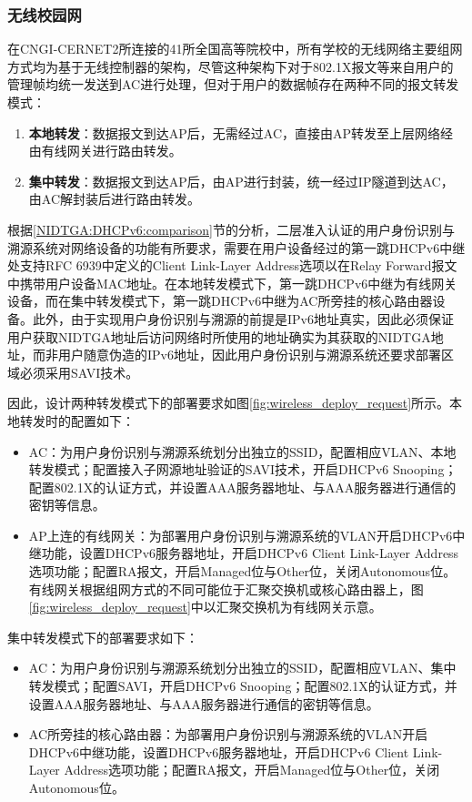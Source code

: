       \subsubsection{无线校园网}
      \label{NIDTGA:DHCPv6:deploy:wireless}
      在CNGI-CERNET2所连接的41所全国高等院校中，所有学校的无线网络主要组网方式均为基于无线控制器的架构，尽管这种架构下对于802.1X报文等来自用户的管理帧均统一发送到AC进行处理，但对于用户的数据帧存在两种不同的报文转发模式：
      \begin{enumerate}[1{)}]
        \item \textbf{本地转发}：数据报文到达AP后，无需经过AC，直接由AP转发至上层网络经由有线网关进行路由转发。
        \item \textbf{集中转发}：数据报文到达AP后，由AP进行封装，统一经过IP隧道到达AC，由AC解封装后进行路由转发。
      \end{enumerate}

      根据\ref{NIDTGA:DHCPv6:comparison}节的分析，二层准入认证的用户身份识别与溯源系统对网络设备的功能有所要求，需要在用户设备经过的第一跳DHCPv6中继处支持RFC 6939中定义的Client Link-Layer Address选项以在Relay Forward报文中携带用户设备MAC地址。在本地转发模式下，第一跳DHCPv6中继为有线网关设备，而在集中转发模式下，第一跳DHCPv6中继为AC所旁挂的核心路由器设备。此外，由于实现用户身份识别与溯源的前提是IPv6地址真实，因此必须保证用户获取NIDTGA地址后访问网络时所使用的地址确实为其获取的NIDTGA地址，而非用户随意伪造的IPv6地址，因此用户身份识别与溯源系统还要求部署区域必须采用SAVI技术。

      因此，设计两种转发模式下的部署要求如图\ref{fig:wireless_deploy_request}所示。本地转发时的配置如下：
      \begin{itemize}
        \item AC：为用户身份识别与溯源系统划分出独立的SSID，配置相应VLAN、本地转发模式；配置接入子网源地址验证的SAVI技术，开启DHCPv6 Snooping；配置802.1X的认证方式，并设置AAA服务器地址、与AAA服务器进行通信的密钥等信息。
        \item AP上连的有线网关：为部署用户身份识别与溯源系统的VLAN开启DHCPv6中继功能，设置DHCPv6服务器地址，开启DHCPv6 Client Link-Layer Address选项功能；配置RA报文，开启Managed位与Other位，关闭Autonomous位。有线网关根据组网方式的不同可能位于汇聚交换机或核心路由器上，图\ref{fig:wireless_deploy_request}中以汇聚交换机为有线网关示意。
      \end{itemize}

      集中转发模式下的部署要求如下：
      \begin{itemize}
        \item AC：为用户身份识别与溯源系统划分出独立的SSID，配置相应VLAN、集中转发模式；配置SAVI，开启DHCPv6 Snooping；配置802.1X的认证方式，并设置AAA服务器地址、与AAA服务器进行通信的密钥等信息。
        \item AC所旁挂的核心路由器：为部署用户身份识别与溯源系统的VLAN开启DHCPv6中继功能，设置DHCPv6服务器地址，开启DHCPv6 Client Link-Layer Address选项功能；配置RA报文，开启Managed位与Other位，关闭Autonomous位。
      \end{itemize}

